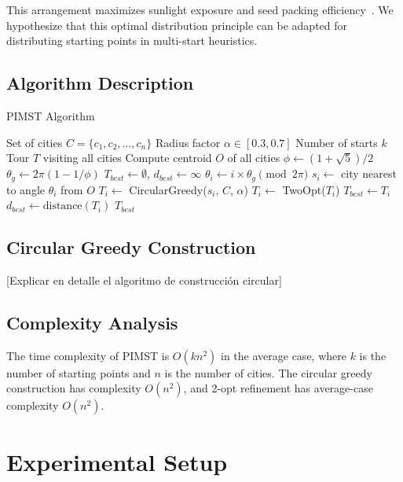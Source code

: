 \documentclass[conference]{IEEEtran}
\begin{document}
This arrangement maximizes sunlight exposure and seed packing efficiency~\cite{vogel1979phyllotaxis}. We hypothesize that this optimal distribution principle can be adapted for distributing starting points in multi-start heuristics.

\subsection{Algorithm Description}

\begin{algorithm}
\caption{PIMST Algorithm}
\begin{algorithmic}[1]
\REQUIRE Set of cities $C = \{c_1, c_2, \ldots, c_n\}$
\REQUIRE Radius factor $\alpha \in [0.3, 0.7]$
\REQUIRE Number of starts $k$
\ENSURE Tour $T$ visiting all cities
\STATE Compute centroid $O$ of all cities
\STATE $\phi \leftarrow (1 + \sqrt{5})/2$
\STATE $\theta_g \leftarrow 2\pi(1 - 1/\phi)$
\STATE $T_{best} \leftarrow \emptyset$, $d_{best} \leftarrow \infty$
    \STATE $\theta_i \leftarrow i \times \theta_g \pmod{2\pi}$
    \STATE $s_i \leftarrow$ city nearest to angle $\theta_i$ from $O$
    \STATE $T_i \leftarrow$ CircularGreedy($s_i$, $C$, $\alpha$)
    \STATE $T_i \leftarrow$ TwoOpt($T_i$)
        \STATE $T_{best} \leftarrow T_i$
        \STATE $d_{best} \leftarrow \text{distance}(T_i)$
    \ENDIF
\ENDFOR
\RETURN $T_{best}$
\end{algorithmic}
\end{algorithm}

\subsection{Circular Greedy Construction}
[Explicar en detalle el algoritmo de construcción circular]

\subsection{Complexity Analysis}
The time complexity of PIMST is $O(kn^2)$ in the average case, where $k$ is the number of starting points and $n$ is the number of cities. The circular greedy construction has complexity $O(n^2)$, and 2-opt refinement has average-case complexity $O(n^2)$.

\section{Experimental Setup}
\end{document}
